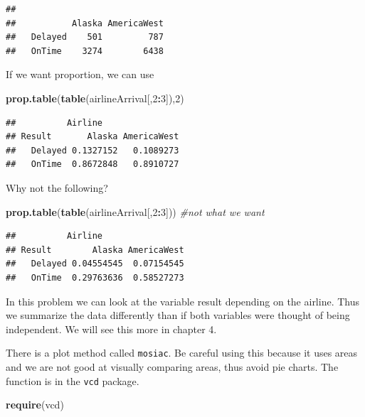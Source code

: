 \documentclass[]{book}
\newenvironment{Shaded}{\begin{snugshade}}{\end{snugshade}}
\newcommand{\KeywordTok}[1]{\textcolor[rgb]{0.13,0.29,0.53}{\textbf{#1}}}
\newcommand{\DecValTok}[1]{\textcolor[rgb]{0.00,0.00,0.81}{#1}}
\newcommand{\CommentTok}[1]{\textcolor[rgb]{0.56,0.35,0.01}{\textit{#1}}}
\newcommand{\OperatorTok}[1]{\textcolor[rgb]{0.81,0.36,0.00}{\textbf{#1}}}
\newcommand{\NormalTok}[1]{#1}
\theoremstyle{definition}
\theoremstyle{definition}
\theoremstyle{definition}
\theoremstyle{remark}
\begin{document}
\begin{verbatim}
##          
##           Alaska AmericaWest
##   Delayed    501         787
##   OnTime    3274        6438
\end{verbatim}

If we want proportion, we can use

\begin{Shaded}
\begin{Highlighting}[]
\KeywordTok{prop.table}\NormalTok{(}\KeywordTok{table}\NormalTok{(airlineArrival[,}\DecValTok{2}\OperatorTok{:}\DecValTok{3}\NormalTok{]),}\DecValTok{2}\NormalTok{)}
\end{Highlighting}
\end{Shaded}

\begin{verbatim}
##          Airline
## Result       Alaska AmericaWest
##   Delayed 0.1327152   0.1089273
##   OnTime  0.8672848   0.8910727
\end{verbatim}

Why not the following?

\begin{Shaded}
\begin{Highlighting}[]
\KeywordTok{prop.table}\NormalTok{(}\KeywordTok{table}\NormalTok{(airlineArrival[,}\DecValTok{2}\OperatorTok{:}\DecValTok{3}\NormalTok{])) }\CommentTok{#not what we want}
\end{Highlighting}
\end{Shaded}

\begin{verbatim}
##          Airline
## Result        Alaska AmericaWest
##   Delayed 0.04554545  0.07154545
##   OnTime  0.29763636  0.58527273
\end{verbatim}

In this problem we can look at the variable result depending on the
airline. Thus we summarize the data differently than if both variables
were thought of being independent. We will see this more in chapter 4.

There is a plot method called \texttt{mosiac}. Be careful using this
because it uses areas and we are not good at visually comparing areas,
thus avoid pie charts. The function is in the \texttt{vcd} package.

\begin{Shaded}
\begin{Highlighting}[]
\KeywordTok{require}\NormalTok{(vcd)}
\end{Highlighting}
\end{Shaded}
\end{document}
